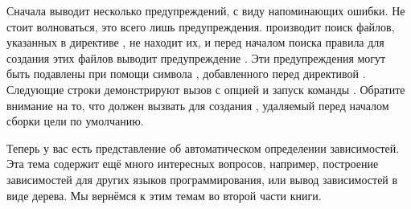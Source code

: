 Сначала \GNUmake{} выводит несколько предупреждений, с виду
напоминающих ошибки. Не стоит волноваться, это всего лишь
предупреждения. \GNUmake{} производит поиск файлов, указанных в
директиве 
, не находит их, и перед началом поиска правила для
создания этих файлов выводит предупреждение . Эти предупреждения могут быть подавлены при помощи символа
\command{-}, добавленного перед директивой .
Следующие строки демонстрируют вызов  с опцией
 и запуск команды .  Обратите внимание на то,
что \GNUmake{} должен вызвать  для создания
, удаляемый перед началом сборки цели по умолчанию.

Теперь у вас есть представление об автоматическом определении
зависимостей. Эта тема содержит ещё много интересных вопросов,
например, построение зависимостей для других языков программирования,
или вывод зависимостей в виде дерева. Мы вернёмся к этим темам во
второй части книги.
